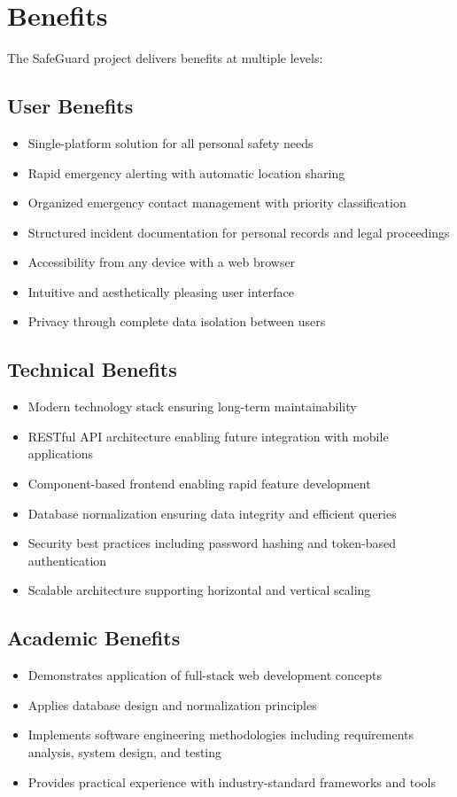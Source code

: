 \section{Benefits}

The SafeGuard project delivers benefits at multiple levels:

\subsection{User Benefits}
\begin{itemize}
  \item Single-platform solution for all personal safety needs
  \item Rapid emergency alerting with automatic location sharing
  \item Organized emergency contact management with priority classification
  \item Structured incident documentation for personal records and legal proceedings
  \item Accessibility from any device with a web browser
  \item Intuitive and aesthetically pleasing user interface
  \item Privacy through complete data isolation between users
\end{itemize}

\subsection{Technical Benefits}
\begin{itemize}
  \item Modern technology stack ensuring long-term maintainability
  \item RESTful API architecture enabling future integration with mobile applications
  \item Component-based frontend enabling rapid feature development
  \item Database normalization ensuring data integrity and efficient queries
  \item Security best practices including password hashing and token-based authentication
  \item Scalable architecture supporting horizontal and vertical scaling
\end{itemize}

\subsection{Academic Benefits}
\begin{itemize}
  \item Demonstrates application of full-stack web development concepts
  \item Applies database design and normalization principles
  \item Implements software engineering methodologies including requirements analysis, system design, and testing
  \item Provides practical experience with industry-standard frameworks and tools
\end{itemize}

